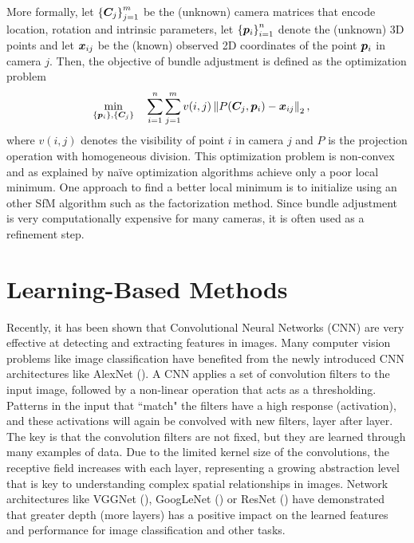 			More formally, let 
			$\left \lbrace \bm{C}_j \right \rbrace_{j = 1}^{m}$ 
			be the (unknown) camera matrices that encode location, rotation and intrinsic parameters, let 
			$\left \lbrace \bm{p}_i \right \rbrace_{i = 1}^{n}$ 
			denote the (unknown) 3D points and let $\bm{x}_{ij}$ be the (known) observed 2D coordinates of the point $\bm{p}_i$ in camera $j$.
			Then, the objective of bundle adjustment is defined as the optimization problem 
			\begin{equation}\label{eq:bundle_adjustment}
				\begin{aligned}
					& \underset{\left\lbrace \bm{p}_i \right\rbrace, \left\lbrace \bm{C}_j \right\rbrace}{\text{min}}
					& & \sum_{i = 1}^{n} \sum_{j = 1}^{m} v(i, j) \left\| P(\bm{C}_j, \bm{p}_i) - \bm{x}_{ij} \right\|_2 ,
				\end{aligned}
			\end{equation}
			where $v(i, j)$ denotes the visibility of point $i$ in camera $j$ and $P$ is the projection operation with homogeneous division.
			This optimization problem is non-convex and as explained by \cite{survey2017} na\"ive optimization algorithms achieve only a poor local minimum.
			One approach to find a better local minimum is to initialize using an other SfM algorithm such as the factorization method.
			Since bundle adjustment is very computationally expensive for many cameras, it is often used as a refinement step.
			
			
	\section{Learning-Based Methods}
	\label{sec:learning_based_methods}
	
		Recently, it has been shown that Convolutional Neural Networks (CNN) are very effective at detecting and extracting features in images. 
		Many computer vision problems like image classification have benefited from the newly introduced CNN architectures like AlexNet (\cite{krizhevsky2012imagenet}).
		A CNN applies a set of convolution filters to the input image, followed by a non-linear operation that acts as a thresholding. 
		Patterns in the input that ``match" the filters have a high response (activation), and these activations will again be convolved with new filters, layer after layer.
		The key is that the convolution filters are not fixed, but they are learned through many examples of data.
		Due to the limited kernel size of the convolutions, the receptive field increases with each layer, representing a growing abstraction level that is key to understanding complex spatial relationships in images.
		Network architectures like VGGNet (\cite{simonyan2014very}), GoogLeNet (\cite{szegedy2015going}) or ResNet (\cite{he2016deep}) have demonstrated that greater depth (more layers) has a positive impact on the learned features and performance for image classification and other tasks.
	

